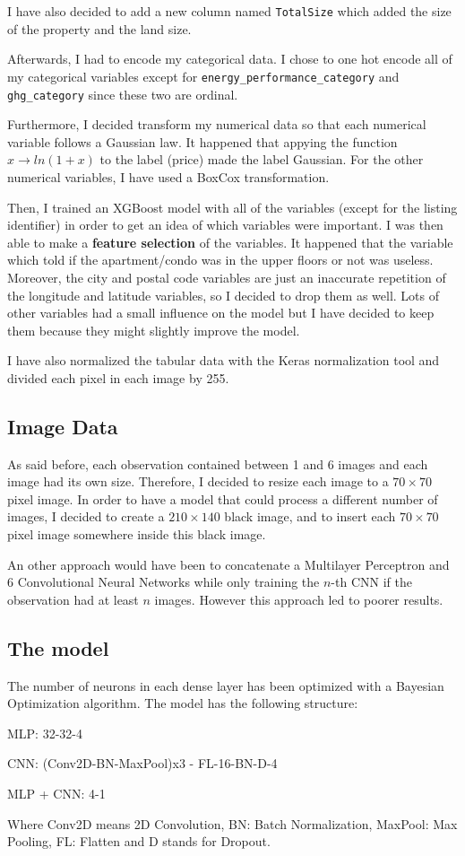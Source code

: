 \documentclass[11pt, a4paper, twocolumn]{article}
\begin{document}
I have also decided to add a new column named \verb+TotalSize+ which added the size of the property and the land size. 

Afterwards, I had to encode my categorical data. I chose to one hot encode all of my categorical variables except for \verb+energy_performance_category+ and \verb+ghg_category+ since these two are ordinal. 

Furthermore, I decided transform my numerical data so that each numerical variable follows a Gaussian law. It happened that appying the function $x \to ln(1+x)$ to the label (price) made the label Gaussian. For the other numerical variables, I have used a BoxCox transformation.

Then, I trained an XGBoost model with all of the variables (except for the listing identifier) in order to get an idea of which variables were important. I was then able to make a \textbf{feature selection} of the variables. It happened that the variable which told if the apartment/condo was in the upper floors or not was useless. Moreover, the city and postal code variables are just an inaccurate repetition of the longitude and latitude variables, so I decided to drop them as well. Lots of other variables had a small influence on the model but I have decided to keep them because they might slightly improve the model.

 I have also normalized the tabular data with the Keras normalization tool and divided each pixel in each image by 255. 
 
 \subsection{Image Data}
 As said before, each observation contained between 1 and 6 images and each image had its own size. Therefore, I decided to resize each image to a $70 \times 70$ pixel image. In order to have a model that could process a different number of images, I decided to create a $210 \times 140$ black image, and to insert each $70 \times 70$ pixel image somewhere inside this black image. 

 An other approach would have been to concatenate a Multilayer Perceptron and 6 Convolutional Neural Networks while only training the $n$-th CNN if the observation had at least $n$ images. However this approach led to poorer results. 

 \subsection{The model}
The number of neurons in each dense layer has been optimized with a Bayesian Optimization algorithm. The model has the following structure: 
\begin{description}
    \item MLP: 32-32-4
    \item CNN: (Conv2D-BN-MaxPool)x3 - FL-16-BN-D-4
    \item MLP + CNN: 4-1
\end{description}
Where Conv2D means 2D Convolution, BN: Batch Normalization, MaxPool: Max Pooling, FL: Flatten and D stands for Dropout.
\end{document}
